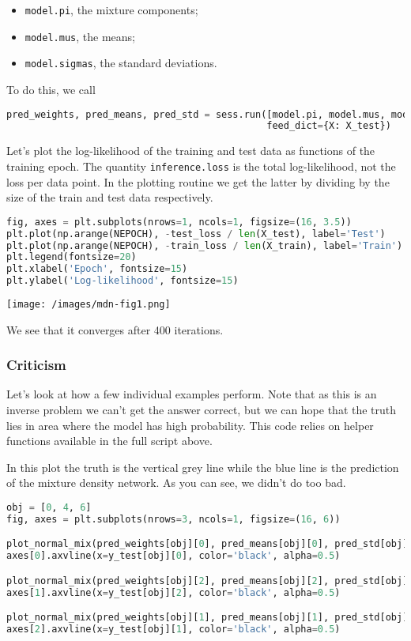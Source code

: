 \begin{itemize}
\item
\texttt{model.pi}, the mixture components;
\item
\texttt{model.mus}, the means;
\item
\texttt{model.sigmas}, the standard deviations.
\end{itemize}

To do this, we call
\begin{lstlisting}[language=Python]
pred_weights, pred_means, pred_std = sess.run([model.pi, model.mus, model.sigmas],
                                              feed_dict={X: X_test})
\end{lstlisting}

Let's plot the log-likelihood of the training and test data as
functions of the training epoch. The quantity \texttt{inference.loss}
is the total log-likelihood, not the loss per data point.  In the
plotting routine we get the latter by dividing by the size of the
train and test data respectively.

\begin{lstlisting}[language=Python]
fig, axes = plt.subplots(nrows=1, ncols=1, figsize=(16, 3.5))
plt.plot(np.arange(NEPOCH), -test_loss / len(X_test), label='Test')
plt.plot(np.arange(NEPOCH), -train_loss / len(X_train), label='Train')
plt.legend(fontsize=20)
plt.xlabel('Epoch', fontsize=15)
plt.ylabel('Log-likelihood', fontsize=15)
\end{lstlisting}

\texttt{[image: /images/mdn-fig1.png]}

We see that it converges after 400 iterations.

\subsubsection{Criticism}

Let's look at how a few individual examples perform. Note that as this
is an inverse problem we can't get the answer correct, but we can hope
that the truth lies in area where the model has high probability. This code relies on helper functions
available in the full script above.

In this plot the truth is the vertical grey line while the blue line is the prediction of the mixture density network. As you can see, we didn't do too bad.

\begin{lstlisting}[language=Python]
obj = [0, 4, 6]
fig, axes = plt.subplots(nrows=3, ncols=1, figsize=(16, 6))

plot_normal_mix(pred_weights[obj][0], pred_means[obj][0], pred_std[obj][0], axes[0], comp=False)
axes[0].axvline(x=y_test[obj][0], color='black', alpha=0.5)

plot_normal_mix(pred_weights[obj][2], pred_means[obj][2], pred_std[obj][2], axes[1], comp=False)
axes[1].axvline(x=y_test[obj][2], color='black', alpha=0.5)

plot_normal_mix(pred_weights[obj][1], pred_means[obj][1], pred_std[obj][1], axes[2], comp=False)
axes[2].axvline(x=y_test[obj][1], color='black', alpha=0.5)
\end{lstlisting}

